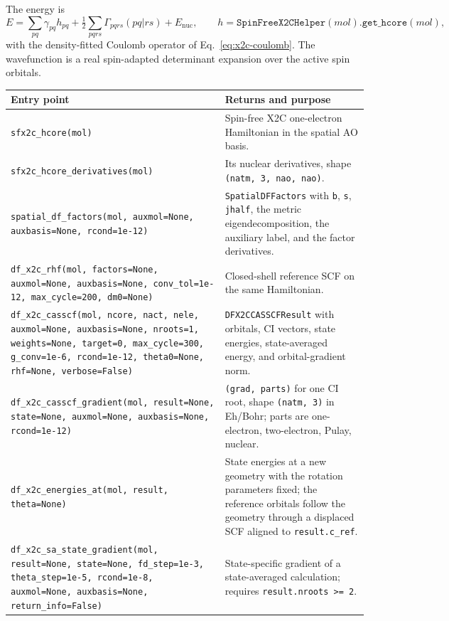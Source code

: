 The energy is
\begin{equation}
  E = \sum_{pq}\gamma_{pq}h_{pq}
    + \tfrac{1}{2}\sum_{pqrs}\Gamma_{pqrs}(pq|rs)+E_{\mathrm{nuc}},
  \qquad
  h=\texttt{SpinFreeX2CHelper}(mol).\texttt{get\_hcore}(mol),
  \label{eq:x2c-scalar-energy}
\end{equation}
with the density-fitted Coulomb operator of
Eq.~\eqref{eq:x2c-coulomb}.  The wavefunction is a real spin-adapted
determinant expansion over the active spin orbitals.

\begin{center}
\small
\begin{tabularx}{\textwidth}{>{\raggedright\arraybackslash}p{}X}
\toprule
Entry point & Returns and purpose \\
\midrule
\texttt{sfx2c\_hcore(mol)} &
  Spin-free X2C one-electron Hamiltonian in the spatial AO basis. \\
\texttt{sfx2c\_hcore\_derivatives(mol)} &
  Its nuclear derivatives, shape \texttt{(natm, 3, nao, nao)}. \\
\texttt{spatial\_df\_factors(mol, auxmol=None, auxbasis=None,
  rcond=1e-12)} &
  \texttt{SpatialDFFactors} with \texttt{b}, \texttt{s},
  \texttt{jhalf}, the metric eigendecomposition, the auxiliary label,
  and the factor derivatives. \\
\texttt{df\_x2c\_rhf(mol, factors=None, auxmol=None, auxbasis=None,
  conv\_tol=1e-12, max\_cycle=200, dm0=None)} &
  Closed-shell reference SCF on the same Hamiltonian. \\
\texttt{df\_x2c\_casscf(mol, ncore, nact, nele, auxmol=None,
  auxbasis=None, nroots=1, weights=None, target=0, max\_cycle=300,
  g\_conv=1e-6, rcond=1e-12, theta0=None, rhf=None, verbose=False)} &
  \texttt{DFX2CCASSCFResult} with orbitals, CI vectors, state
  energies, state-averaged energy, and orbital-gradient norm. \\
\texttt{df\_x2c\_casscf\_gradient(mol, result=None, state=None,
  auxmol=None, auxbasis=None, rcond=1e-12)} &
  \texttt{(grad, parts)} for one CI root, shape \texttt{(natm, 3)} in
  Eh/Bohr; parts are one-electron, two-electron, Pulay, nuclear. \\
\texttt{df\_x2c\_energies\_at(mol, result, theta=None)} &
  State energies at a new geometry with the rotation parameters fixed;
  the reference orbitals follow the geometry through a displaced SCF
  aligned to \texttt{result.c\_ref}. \\
\texttt{df\_x2c\_sa\_state\_gradient(mol, result=None, state=None,
  fd\_step=1e-3, theta\_step=1e-5, rcond=1e-8, auxmol=None,
  auxbasis=None, return\_info=False)} &
  State-specific gradient of a state-averaged calculation; requires
  \texttt{result.nroots >= 2}. \\
\bottomrule
\end{tabularx}
\end{center}

